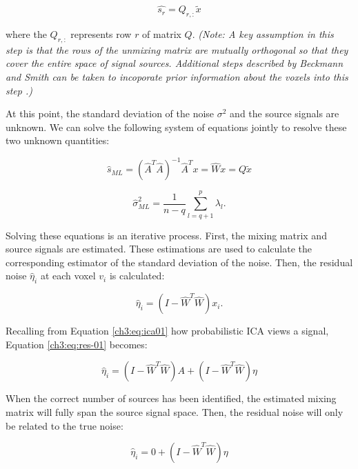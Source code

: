 \begin{equation}
\hat{s_r} = Q_{r,:} \tilde{x}
\end{equation}

\noindent where the $Q_{r, :}$ represents row $r$ of matrix $Q$.  \textit{(Note: A key assumption in this step is that the rows of the unmixing matrix are mutually orthogonal so that they cover the entire space of signal sources. Additional steps described by Beckmann and Smith can be taken to incoporate prior information about the voxels into this step \cite{Beckmann2004}.)}

At this point, the standard deviation of the noise $\sigma^2$ and the source signals are unknown. We can solve the following system of equations jointly to resolve these two unknown quantities:

\begin{equation}
\hat{s}_{ML} = (\hat{A}^T\hat{A})^{-1}\hat{A}^Tx = \hat{W}x = Q \tilde{x}
\end{equation}

\begin{equation}
\hat{\sigma}_{ML}^2 = \frac{1}{n-q} \sum_{l=q+1}^p \lambda_l .
\end{equation}

Solving these equations is an iterative process. First, the mixing matrix and source signals are estimated. These estimations are used to calculate the corresponding estimator of the standard deviation of the noise. Then, the residual noise $\hat{\eta}_i$ at each voxel $v_i$ is calculated:

\begin{equation}
\label{ch3:eq:res-01}
\hat{\eta}_i = (I - \hat{W}^T\hat{W}) x_i.
\end{equation}

\noindent Recalling from Equation \ref{ch3:eq:ica01} how probabilistic ICA views a signal, Equation \ref{ch3:eq:res-01} becomes: 

\begin{equation}
\hat{\eta}_i = (I - \hat{W}^T\hat{W}) A + (I - \hat{W}^T\hat{W}) \eta
\end{equation}

When the correct number of sources has been identified, the estimated mixing matrix will fully span the source signal space. Then, the residual noise will only be related to the true noise:

\begin{equation}
\hat{\eta}_i = 0 + (I - \hat{W}^T\hat{W}) \eta
\end{equation}

